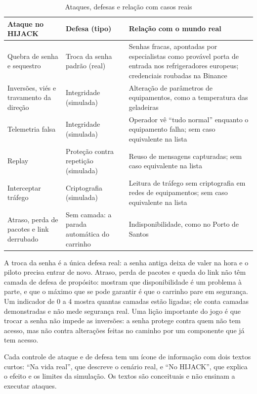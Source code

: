 \documentclass[12pt,openright,oneside,a4paper,english,brazil]{abntex2}
\begin{document}
\begin{table}[htbp]
\centering
\small
\caption{Ataques, defesas e relação com casos reais}
\label{tab:defesas}
\begin{tabularx}{\textwidth}{@{}P{3.4cm}P{3.4cm}L@{}}
\toprule
\textbf{Ataque no HIJACK} & \textbf{Defesa (tipo)} & \textbf{Relação com o mundo real} \\
\midrule
Quebra de senha e sequestro & Troca da senha padrão (real) & Senhas fracas, apontadas por especialistas como provável porta de entrada nos refrigeradores europeus; credenciais roubadas na Binance \\
Inversões, viés e travamento da direção & Integridade (simulada) & Alteração de parâmetros de equipamentos, como a temperatura das geladeiras \\
Telemetria falsa & Integridade (simulada) & Operador vê \enquote{tudo normal} enquanto o equipamento falha; sem caso equivalente na lista \\
Replay & Proteção contra repetição (simulada) & Reuso de mensagens capturadas; sem caso equivalente na lista \\
Interceptar tráfego & Criptografia (simulada) & Leitura de tráfego sem criptografia em redes de equipamentos; sem caso equivalente na lista \\
Atraso, perda de pacotes e link derrubado & Sem camada: a parada automática do carrinho & Indisponibilidade, como no Porto de Santos \\
\bottomrule
\end{tabularx}
\end{table}

A troca da senha é a única defesa real: a senha antiga deixa de valer na hora e o piloto precisa entrar de novo. Atraso, perda de pacotes e queda do link não têm camada de defesa de propósito: mostram que disponibilidade é um problema à parte, e que o máximo que se pode garantir é que o carrinho pare em segurança. Um indicador de 0 a 4 mostra quantas camadas estão ligadas; ele conta camadas demonstradas e não mede segurança real. Uma lição importante do jogo é que trocar a senha não impede as inversões: a senha protege contra quem não tem acesso, mas não contra alterações feitas no caminho por um componente que já tem acesso.

Cada controle de ataque e de defesa tem um ícone de informação com dois textos curtos: \enquote{Na vida real}, que descreve o cenário real, e \enquote{No HIJACK}, que explica o efeito e os limites da simulação. Os textos são conceituais e não ensinam a executar ataques.
\end{document}
